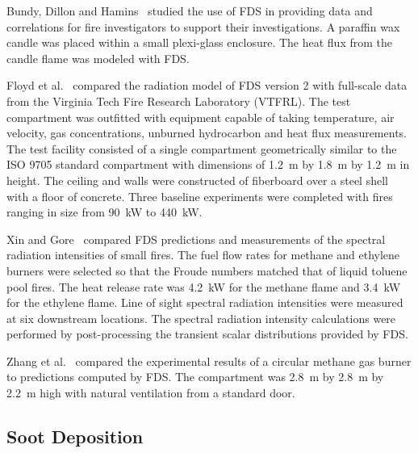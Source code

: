 Bundy, Dillon and Hamins~\cite{Dillon:1,Hamins:FPE2005} studied the use of FDS in providing data and correlations for fire investigators to support their investigations.  A paraffin wax candle was placed within a small plexi-glass enclosure. The heat flux from the candle flame was modeled with FDS.

Floyd et al.~\cite{Floyd:1,Floyd:6} compared the radiation model of FDS version 2 with full-scale data from the Virginia Tech Fire Research Laboratory (VTFRL). The test compartment was outfitted with equipment capable  of taking  temperature,  air velocity,  gas concentrations, unburned hydrocarbon and heat flux measurements. The test facility consisted of a single compartment geometrically similar to the ISO 9705 standard compartment with dimensions of 1.2~m by 1.8~m by 1.2~m in height.  The ceiling and walls were constructed of fiberboard over a steel shell with a floor of concrete.  Three baseline experiments were completed with fires ranging in size from 90~kW to 440~kW.

Xin  and Gore~\cite{Xin:JSS2003}  compared  FDS predictions  and measurements of the spectral radiation intensities of small fires. The fuel flow rates for methane and ethylene burners were selected so that the Froude numbers matched that of liquid toluene pool fires. The heat release rate was 4.2~kW for the methane flame and 3.4~kW for the ethylene flame. Line of sight spectral radiation intensities were measured at six downstream locations.  The spectral radiation intensity calculations were performed by post-processing the transient scalar distributions provided by FDS.

Zhang et al.~\cite{Zhang:1} compared the experimental results of a circular methane gas burner to predictions computed by FDS. The compartment was 2.8~m by 2.8~m by 2.2~m high with natural ventilation from a standard door.




\subsection{Soot Deposition}

